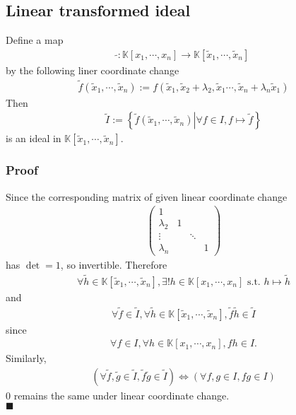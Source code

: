 \documentclass[11pt]{book}
\begin{document}
\subsection{Linear transformed ideal}
\label{LinearTransformedIdeal}
Define a map
\begin{eqnarray}
\tilde{} : \mathbb{K}[x_1, \cdots, x_n] \to \mathbb{K}[\tilde{x}_1, \cdots, \tilde{x}_n] 
\end{eqnarray}
by the following liner coordinate change
\begin{eqnarray}
\tilde{f}(\tilde{x}_1, \cdots, \tilde{x}_n) := f(\tilde{x}_1,\tilde{x}_2 + \lambda_2, \tilde{x}_1 \cdots,  \tilde{x}_n + \lambda_n \tilde{x}_1)
\end{eqnarray}
Then
\begin{eqnarray}
\tilde{I} := \left\{\left. \tilde{f}(\tilde{x}_1, \cdots, \tilde{x}_n) \right| \forall f \in I, f \mapsto \tilde{f} \right\}
\end{eqnarray}
is an ideal in $\mathbb{K}[\tilde{x}_1, \cdots, \tilde{x}_n]$.

\subsubsection{Proof}
Since the corresponding matrix of given linear coordinate change
\begin{eqnarray}
\left(\begin{array}{cccc}1 &   &   &   \\ \lambda_2 &  1 &   &   \\  \vdots &   &  \ddots &   \\  \lambda_n &   &   & 1 \end{array}\right)
\end{eqnarray}
has $\det = 1$, so invertible.
Therefore 
\begin{eqnarray}
\forall \tilde{h} \in \mathbb{K}[\tilde{x}_1, \cdots, \tilde{x}_n], \exists! h \in \mathbb{K}[x_1, \cdots, x_n] \text{ s.t. } h \mapsto \tilde{h}
\end{eqnarray}
and
\begin{eqnarray}
\forall \tilde{f} \in \tilde{I}, \forall \tilde{h} \in \mathbb{K}[\tilde{x}_1, \cdots, \tilde{x}_n], \tilde{f} \tilde{h} \in \tilde{I}
\end{eqnarray}
since
\begin{eqnarray}
\forall f \in I, \forall h \in \mathbb{K}[x_1, \cdots, x_n], fh \in I.
\end{eqnarray}
Similarly, 
\begin{eqnarray}
(\forall \tilde{f}, \tilde{g} \in \tilde{I}, \tilde{f} \tilde{g} \in \tilde{I})
\Leftrightarrow 
(\forall f,g \in I, fg \in I)
\end{eqnarray}
$0$ remains the same under linear coordinate change.\\
$\blacksquare$
\end{document}
